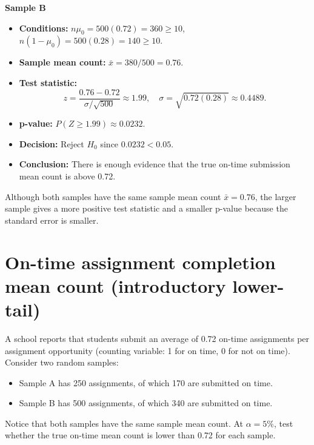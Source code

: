 	\begin{center}
	\end{center}
		

	
	\textbf{Sample B}
	
	\begin{itemize}
	\item \textbf{Conditions:} \(n\mu_0=500(0.72)=360\ge10\), \(n(1-\mu_0)=500(0.28)=140\ge10\).
	\item \textbf{Sample mean count:} \(\bar x=380/500=0.76\).
		\item \textbf{Test statistic:}
		\[
	z=\frac{0.76-0.72}{\sigma/\sqrt{500}}\approx 1.99,\quad \sigma=\sqrt{0.72(0.28)}\approx0.4489.
	\]
	\item \textbf{p-value:} \(P(Z\ge 1.99)\approx 0.0232\).
	\item \textbf{Decision:} Reject \(H_0\) since \(0.0232<0.05\).
	\item \textbf{Conclusion:} There is enough evidence that the true on-time submission mean count is above 0.72.
		\end{itemize}
		
	\begin{center}
	\end{center}
	

		
	Although both samples have the same sample mean count \(\bar x=0.76\), the larger sample gives a more positive test statistic and a smaller p-value because the standard error is smaller.
		
\section{On-time assignment completion mean count (introductory lower-tail)}
A school reports that students submit an average of 0.72 on-time assignments per assignment opportunity (counting variable: 1 for on time, 0 for not on time). Consider two random samples:
\begin{itemize}
	\item Sample A has 250 assignments, of which 170 are submitted on time.
	\item Sample B has 500 assignments, of which 340 are submitted on time.
\end{itemize}
Notice that both samples have the same sample mean count. At \(\alpha=5\%\), test whether the true on-time mean count is lower than 0.72 for each sample.

